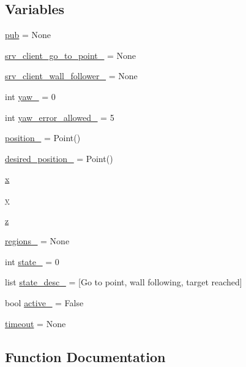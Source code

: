\subsection*{Variables}
\begin{DoxyCompactItemize}
\item 
\hyperlink{namespacebug__m_adc14150838edf40c8028207cd6bb2082}{pub} = None
\item 
\hyperlink{namespacebug__m_abd32bbd25b55f71e56505e72ba56c2f6}{srv\+\_\+client\+\_\+go\+\_\+to\+\_\+point\+\_\+} = None
\item 
\hyperlink{namespacebug__m_af40e8063430e5b54ef2f3f8368338744}{srv\+\_\+client\+\_\+wall\+\_\+follower\+\_\+} = None
\item 
int \hyperlink{namespacebug__m_a8b5b5c9259592b8efd526c5adb95d95b}{yaw\+\_\+} = 0
\item 
int \hyperlink{namespacebug__m_a23e5e76f14d9d0d139767cb229a53dda}{yaw\+\_\+error\+\_\+allowed\+\_\+} = 5
\item 
\hyperlink{namespacebug__m_ab108d02234aa3ec58605b9f6980ec090}{position\+\_\+} = Point()
\item 
\hyperlink{namespacebug__m_a8fb60e35f164091fe3355d3a0bce95af}{desired\+\_\+position\+\_\+} = Point()
\item 
\hyperlink{namespacebug__m_af10f89c7f929c9babce108f5d7382996}{x}
\item 
\hyperlink{namespacebug__m_ab8596d2ae799585b0d89152b55891aa8}{y}
\item 
\hyperlink{namespacebug__m_afbb54887da57b97920c8d36c6daed1fc}{z}
\item 
\hyperlink{namespacebug__m_ac9d4d95c034fca5a2b5d08ea845bbfcb}{regions\+\_\+} = None
\item 
int \hyperlink{namespacebug__m_a79dc362dff5bef439beacdd5c0c3b2f1}{state\+\_\+} = 0
\item 
list \hyperlink{namespacebug__m_ae70f71d3816862f72790fae7bfaa543b}{state\+\_\+desc\+\_\+} = \mbox{[}\textquotesingle{}Go to point\textquotesingle{}, \textquotesingle{}wall following\textquotesingle{}, \textquotesingle{}target reached\textquotesingle{}\mbox{]}
\item 
bool \hyperlink{namespacebug__m_aac2be257b1acdebfb27dab0e311550d4}{active\+\_\+} = False
\item 
\hyperlink{namespacebug__m_ad56f445349e05abe7f111b48e25d3ecb}{timeout} = None
\end{DoxyCompactItemize}


\subsection{Function Documentation}
